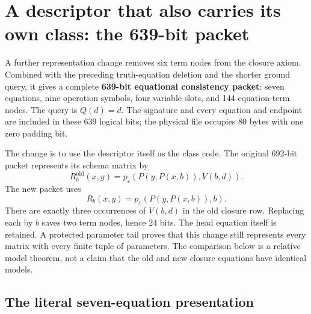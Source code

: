 \section{A descriptor that also carries its own class: the 639-bit packet}
\label{sec:e639}

A further representation change removes six term nodes from the closure
axiom.  Combined with the preceding truth-equation deletion and the shorter
ground query, it gives a complete \textbf{639-bit equational consistency
packet}: seven equations, nine operation symbols, four variable slots, and
144 equation-term nodes.  The query is \(Q(d)=d\).  The signature and every
equation and endpoint are included in these 639 logical bits; the physical
file occupies 80 bytes with one zero padding bit.

The change is to use the descriptor itself as the class code.  The original
692-bit packet represents its schema matrix by
\[
 R_b^{\mathrm{old}}(x,y)
   =p_\varepsilon(P(y,P(x,b)),V(b,d)).
\]
The new packet uses
\begin{equation}
                  R_b(x,y)=p_\varepsilon(P(y,P(x,b)),b).
\label{eq:e639-R}
\end{equation}
There are exactly three occurrences of \(V(b,d)\) in the old closure row.
Replacing each by \(b\) saves two term nodes, hence 24 bits.  The head
equation itself is retained.  A protected parameter tail proves that this
change still represents every matrix with every finite tuple of parameters.
The comparison below is a relative model theorem, not a claim that the old
and new closure equations have identical models.

\subsection{The literal seven-equation presentation}

